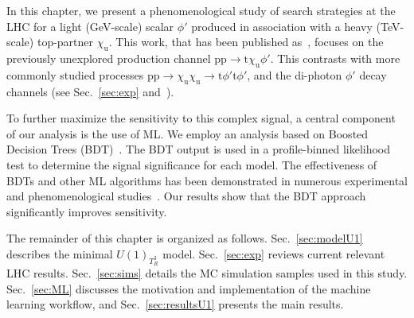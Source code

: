 In this chapter, we present a phenomenological study of search strategies at the LHC for a light (GeV-scale) scalar $\phi'$ produced in association with a heavy (TeV-scale) top-partner $\chi_\mathrm{u}$. This work, that  has been published as~\parencite{Qureshi:2024naw}, focuses on the previously unexplored production channel $\mathrm{pp}\to \mathrm{t}\chi_\mathrm{u}\phi'$. This contrasts with more commonly studied processes $\mathrm{pp}\to \chi_\mathrm{u}\chi_\mathrm{u}\to \mathrm{t}\phi'\mathrm{t}\phi'$, and the di-photon $\phi'$ decay channels (see Sec.~\ref{sec:exp} and~\parencite{Bhardwaj_2022, Bhardwaj_2022_2, Bardhan_2023, Banerjee_2016, Alves_2024}).

To further maximize the sensitivity to this complex signal, a central component of our analysis is the use of ML. We employ an analysis based on Boosted Decision Trees (BDT)~\parencite{friedman_greedy_2001}. The BDT output is used in a profile-binned likelihood test to determine the signal significance for each model. The effectiveness of BDTs and other ML algorithms has been demonstrated in numerous experimental and phenomenological studies~\parencite{Ai:2022qvs, ATLAS:2017fak, Biswas:2018snp, Chung:2020ysf, Feng:2021eke, ttZprime, Chigusa:2022svv, Arganda2024, Ajmal_2024, Dutta_2015}. Our results show that the BDT approach significantly improves sensitivity.


The remainder of this chapter is organized as follows. Sec.~\ref{sec:modelU1} describes the minimal $U(1)_{T^3_R}$ model. Sec.~\ref{sec:exp} reviews current relevant LHC results. Sec.~\ref{sec:sims} details the MC simulation samples used in this study. Sec.~\ref{sec:ML} discusses the motivation and implementation of the machine learning workflow, and Sec.~\ref{sec:resultsU1} presents the main results.






